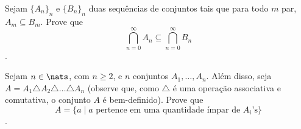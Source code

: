 \begin{exercise}
Sejam $\{A_n\}_n$ e $\{B_n\}_n$ duas sequências de conjuntos tais que para todo $m$ par, $A_m \subseteq B_m$. Prove que $$\bigcap_{n=0}^{\infty} A_n \subseteq \bigcap_{n=0}^{\infty} B_n$$.
\end{exercise}

\begin{exercise}
Sejam $n \in \nats$, com $n \ge 2$, e $n$ conjuntos $A_1, \dots, A_n$. Além disso, seja $A = A_1 \triangle A_2 \triangle \dots \triangle A_n$ (observe que, como $\triangle$ é uma operação associativa e comutativa, o conjunto $A$ é bem-definido). Prove que $$A = \{a \mid a \text{ pertence em uma quantidade ímpar de $A_i$'s}\}$$.
\end{exercise}